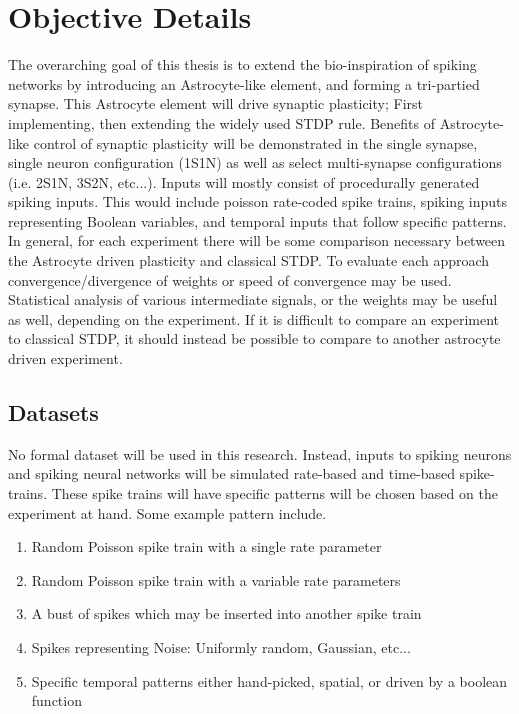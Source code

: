 %
%


\chapter{Objective Details} \label{section:objective_details}
    The overarching goal of this thesis is to extend the bio-inspiration of
    spiking networks by introducing an Astrocyte-like element, and forming a
    tri-partied synapse. This Astrocyte element will drive synaptic plasticity;
    First implementing, then extending the widely used STDP rule. Benefits of
    Astrocyte-like control of synaptic plasticity will be demonstrated in the
    single synapse, single neuron configuration (1S1N) as well as select
    multi-synapse configurations (i.e. 2S1N, 3S2N, etc...). Inputs will mostly
    consist of procedurally generated spiking inputs. This would include poisson
    rate-coded spike trains, spiking inputs representing Boolean variables, and
    temporal inputs that follow specific patterns. In general, for each
    experiment there will be some comparison necessary between the Astrocyte
    driven plasticity and classical STDP. To evaluate each approach
    convergence/divergence of weights or speed of convergence may be
    used. Statistical analysis of various intermediate signals, or the weights
    may be useful as well, depending on the experiment. If it is difficult to
    compare an experiment to classical STDP, it should instead be possible to
    compare to another astrocyte driven experiment.

    \section{Datasets} \label{section:datasets}
    No formal dataset will be used in this research. Instead, inputs to spiking
    neurons and spiking neural networks will be simulated rate-based and
    time-based spike-trains. These spike trains will have specific patterns will
    be chosen based on the experiment at hand. Some example pattern include.
    \begin{enumerate}
    \item Random Poisson spike train with a single rate parameter
    \item Random Poisson spike train with a variable rate parameters
    \item A bust of spikes which may be inserted into another spike train
    \item Spikes representing Noise: Uniformly random, Gaussian, etc...
    \item Specific temporal patterns either hand-picked, spatial, or driven by a
      boolean function
    \end{enumerate}
        
